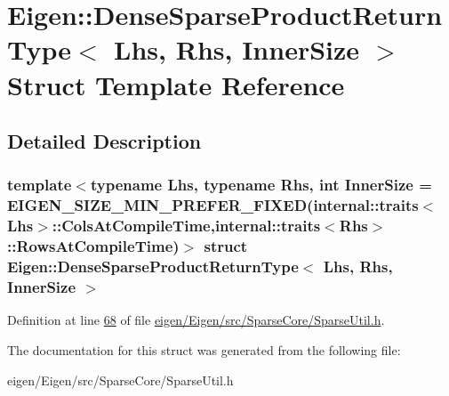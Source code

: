 \hypertarget{struct_eigen_1_1_dense_sparse_product_return_type}{}\section{Eigen\+:\+:Dense\+Sparse\+Product\+Return\+Type$<$ Lhs, Rhs, Inner\+Size $>$ Struct Template Reference}
\label{struct_eigen_1_1_dense_sparse_product_return_type}


\subsection{Detailed Description}
\subsubsection*{template$<$typename Lhs, typename Rhs, int Inner\+Size = E\+I\+G\+E\+N\+\_\+\+S\+I\+Z\+E\+\_\+\+M\+I\+N\+\_\+\+P\+R\+E\+F\+E\+R\+\_\+\+F\+I\+X\+E\+D(internal\+::traits$<$\+Lhs$>$\+::\+Cols\+At\+Compile\+Time,internal\+::traits$<$\+Rhs$>$\+::\+Rows\+At\+Compile\+Time)$>$\newline
struct Eigen\+::\+Dense\+Sparse\+Product\+Return\+Type$<$ Lhs, Rhs, Inner\+Size $>$}



Definition at line \hyperlink{eigen_2_eigen_2src_2_sparse_core_2_sparse_util_8h_source_l00068}{68} of file \hyperlink{eigen_2_eigen_2src_2_sparse_core_2_sparse_util_8h_source}{eigen/\+Eigen/src/\+Sparse\+Core/\+Sparse\+Util.\+h}.



The documentation for this struct was generated from the following file\+:\begin{DoxyCompactItemize}
\item 
eigen/\+Eigen/src/\+Sparse\+Core/\+Sparse\+Util.\+h\end{DoxyCompactItemize}
